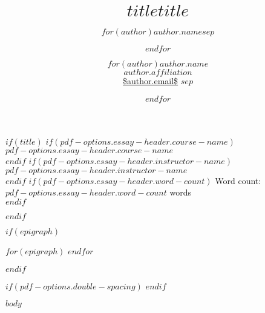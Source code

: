 \documentclass[%
  $if(pdf-options.papersize)$
    $pdf-options.papersize$paper,
  $endif$,
  article,
  $pdf-options.typesize$,
  oneside
  ]{memoir}
\author{$for(author)$$author.name$$sep$ \and $endfor$}
\title{$title$}
\title{\bigskip \bigskip $title$}
\author{$for(author)$\Large $author.name$\\
  \normalsize\emph{$author.affiliation$}\\
  \url{$author.email$}\vspace*{0.2in} $sep$ \and $endfor$}
\renewcommand{\maketitle}{%
    $if(pdf-options.essay-header.course-name)$
      $pdf-options.essay-header.course-name$ \\
    $endif$
    $if(pdf-options.essay-header.instructor-name)$
      $pdf-options.essay-header.instructor-name$ \\
    $endif$
    $if(pdf-options.essay-header.word-count)$
      Word count: $pdf-options.essay-header.word-count$ words \\
    $endif$
    \begin{center}\thetitle\end{center}
    \thispagestyle{title}
   }
\begin{document}
$if(title)$
\maketitle
\thispagestyle{fancy}
$endif$

$if(epigraph)$
\begin{epigraphs}
$for(epigraph)$
$endfor$
\end{epigraphs}
$endif$

$if(pdf-options.double-spacing)$
\DoubleSpacing
$endif$

$body$
\end{document}
